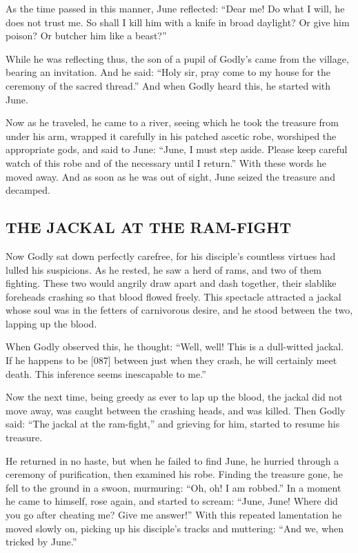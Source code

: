 \documentclass{article}
\begin{document}
As the time passed in this manner, June reflected:
``Dear me! Do what I will, he does not trust me. So shall I kill him with a knife in broad daylight? Or give him poison? Or butcher him like a beast?''

While he was reflecting thus, the son of a pupil of Godly's came
from the village, bearing an invitation. And he said:
``Holy sir, pray come to my house for the ceremony of the sacred thread.''
And when Godly heard this, he started with June.

Now as he traveled, he came to a river, seeing which he took the
treasure from under his arm, wrapped it carefully in his patched
ascetic robe, worshiped the appropriate gods, and said to June:
``June, I must step aside. Please keep careful watch of this robe and of the necessary until I return.''
With these words he moved away. And as soon as he was out of sight,
June seized the treasure and decamped.

\subsection{THE JACKAL AT THE RAM-FIGHT}

Now Godly sat down perfectly carefree, for his disciple's countless
virtues had lulled his suspicions. As he rested, he saw a herd of
rams, and two of them fighting. These two would angrily draw apart
and dash together, their slablike foreheads crashing so that blood
flowed freely. This spectacle attracted a jackal whose soul was in
the fetters of carnivorous desire, and he stood between the two,
lapping up the blood.

When Godly observed this, he thought:
``Well, well! This is a dull-witted jackal. If he happens to be [087] between just when they crash, he will certainly meet death. This inference seems inescapable to me.''

Now the next time, being greedy as ever to lap up the blood, the
jackal did not move away, was caught between the crashing heads,
and was killed. Then Godly said: ``The jackal at the ram-fight,''
and grieving for him, started to resume his treasure.

He returned in no haste, but when he failed to find June, he
hurried through a ceremony of purification, then examined his robe.
Finding the treasure gone, he fell to the ground in a swoon,
murmuring: ``Oh, oh! I am robbed.'' In a moment he came to himself,
rose again, and started to scream:
``June, June! Where did you go after cheating me? Give me answer!''
With this repeated lamentation he moved slowly on, picking up his
disciple's tracks and muttering: ``And we, when tricked by June.''
\end{document}
